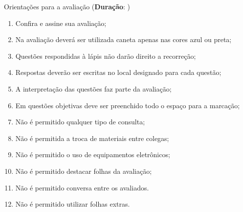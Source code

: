 
\begin{framed}
	\begin{center}
		Orientações para a avaliação (\textbf{Duração}: \underline{\duracao})
	\end{center}
		\begin{multicols}{2}
		\begin{enumerate}
		\item Confira e assine sua avaliação;
		\item Na avaliação deverá ser utilizada caneta apenas nas cores azul ou preta;
		\item Questões respondidas à lápis não darão direito a recorreção;
		\item Respostas deverão ser escritas no local designado para cada questão;
		\item A interpretação das questões faz parte da avaliação;
		\item Em questões objetivas deve ser preenchido todo o espaço para a marcação;
		\item Não é permitido qualquer tipo de consulta;
		\item Não é permitida a troca de materiais entre colegas;
		\item Não é permitido o uso de equipamentos eletrônicos;
		\item Não é permitido destacar folhas da avaliação;
		\item Não é permitido conversa entre os avaliados.		
		\item Não é permitido utilizar folhas extras.		
		\end{enumerate}
		\end{multicols}
\end{framed}